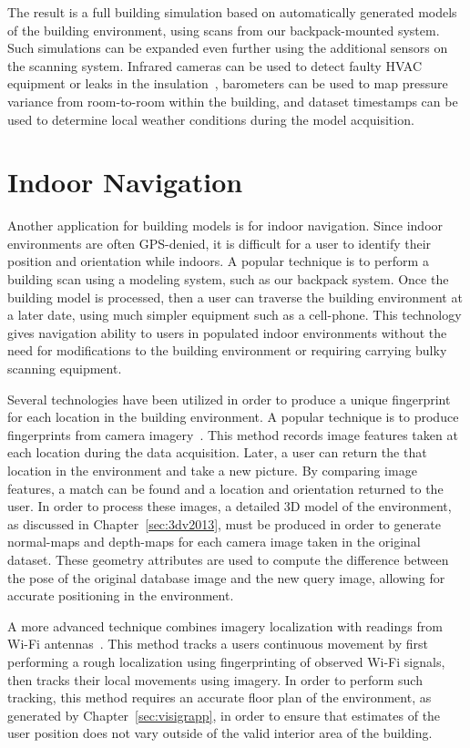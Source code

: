 \documentclass[12pt,onecolumn,oneside]{book}
\begin{document}
The result is a full building simulation based on automatically generated models of the building environment, using scans from our backpack-mounted system.  Such simulations can be expanded even further using the additional sensors on the scanning system.  Infrared cameras can be used to detect faulty HVAC equipment or leaks in the insulation~\cite{Oreifej14}, barometers can be used to map pressure variance from room-to-room within the building, and dataset timestamps can be used to determine local weather conditions during the model acquisition.

\section{Indoor Navigation}
\label{sec:application_indoornav}

Another application for building models is for indoor navigation.  Since indoor environments are often GPS-denied, it is difficult for a user to identify their position and orientation while indoors.  A popular technique is to perform a building scan using a modeling system, such as our backpack system.  Once the building model is processed, then a user can traverse the building environment at a later date, using much simpler equipment such as a cell-phone.  This technology gives navigation ability to users in populated indoor environments without the need for modifications to the building environment or requiring carrying bulky scanning equipment. 

Several technologies have been utilized in order to produce a unique fingerprint for each location in the building environment.  A popular technique is to produce fingerprints from camera imagery~\cite{Liang13}.  This method records image features taken at each location during the data acquisition.  Later, a user can return the that location in the environment and take a new picture.  By comparing image features, a match can be found and a location and orientation returned to the user.  In order to process these images, a detailed 3D model of the environment, as discussed in Chapter~\ref{sec:3dv2013}, must be produced in order to generate normal-maps and depth-maps for each camera image taken in the original dataset.  These geometry attributes are used to compute the difference between the pose of the original database image and the new query image, allowing for accurate positioning in the environment.

A more advanced technique combines imagery localization with readings from Wi-Fi antennas~\cite{Levchev14}.  This method tracks a users continuous movement by first performing a rough localization using fingerprinting of observed Wi-Fi signals, then tracks their local movements using imagery.  In order to perform such tracking, this method requires an accurate floor plan of the environment, as generated by Chapter~\ref{sec:visigrapp}, in order to ensure that estimates of the user position does not vary outside of the valid interior area of the building.
\end{document}
